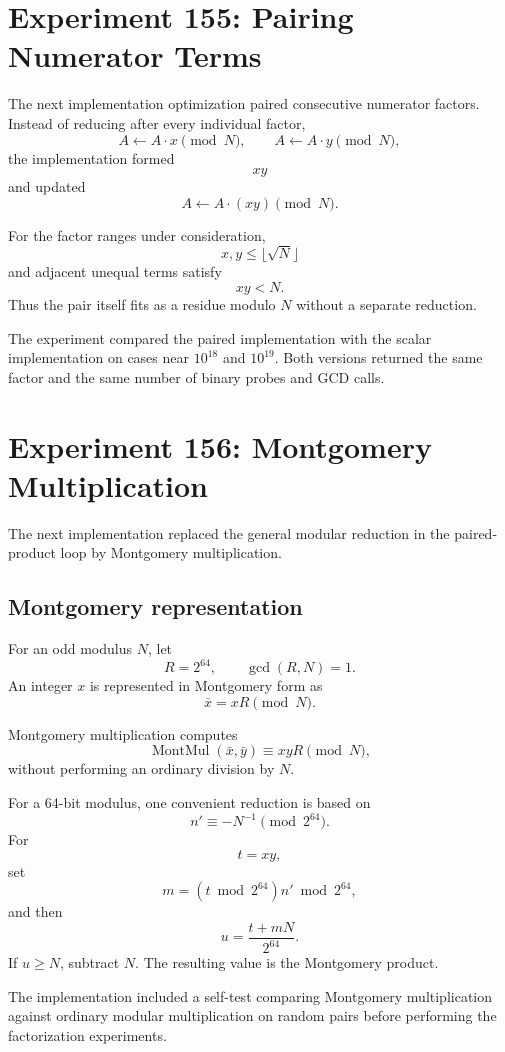 \documentclass[11pt,a4paper]{article}
\begin{document}
\section{Experiment 155: Pairing Numerator Terms}

The next implementation optimization paired consecutive numerator factors. Instead of reducing after every individual factor,
\[
A\leftarrow A\cdot x\pmod N,
\qquad
A\leftarrow A\cdot y\pmod N,
\]
the implementation formed
\[
xy
\]
and updated
\[
A\leftarrow A\cdot(xy)\pmod N.
\]

For the factor ranges under consideration,
\[
x,y\le \lfloor\sqrt N\rfloor
\]
and adjacent unequal terms satisfy
\[
xy<N.
\]
Thus the pair itself fits as a residue modulo $N$ without a separate reduction.

The experiment compared the paired implementation with the scalar implementation on cases near $10^{18}$ and $10^{19}$. Both versions returned the same factor and the same number of binary probes and GCD calls.

\section{Experiment 156: Montgomery Multiplication}

The next implementation replaced the general modular reduction in the paired-product loop by Montgomery multiplication.

\subsection{Montgomery representation}

For an odd modulus $N$, let
\[
R=2^{64},
\qquad
\gcd(R,N)=1.
\]
An integer $x$ is represented in Montgomery form as
\[
\bar{x}=xR\pmod N.
\]

Montgomery multiplication computes
\[
\operatorname{MontMul}(\bar{x},\bar{y})
\equiv xyR\pmod N,
\]
without performing an ordinary division by $N$.

For a 64-bit modulus, one convenient reduction is based on
\[
n'\equiv -N^{-1}\pmod{2^{64}}.
\]
For
\[
t=xy,
\]
set
\[
m=(t\bmod2^{64})n'\bmod2^{64},
\]
and then
\[
u=\frac{t+mN}{2^{64}}.
\]
If $u\ge N$, subtract $N$. The resulting value is the Montgomery product.

The implementation included a self-test comparing Montgomery multiplication against ordinary modular multiplication on random pairs before performing the factorization experiments.
\end{document}
